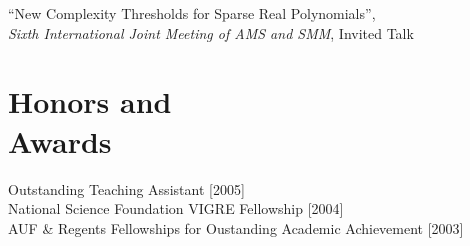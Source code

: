 \documentclass[margin,line,12pt]{resume}
\begin{document}
\begin{resume}
    ``New Complexity Thresholds for Sparse Real Polynomials'',\\
    \textsl{Sixth International Joint Meeting of AMS and SMM}, Invited Talk

    
    
    \section{\mysidestyle Honors and\\Awards} 

    Outstanding Teaching Assistant [2005]                                                           \vspace{1mm}\\
    National Science Foundation VIGRE Fellowship [2004]                                             \vspace{1mm}\\
    AUF \& Regents Fellowships for Oustanding Academic Achievement [2003]                           








\end{resume}
\end{document}
